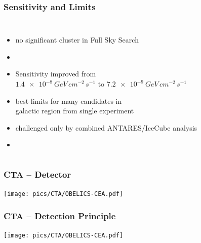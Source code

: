 \documentclass[8pt]{beamer}
\newcommand\unit[2]{\SI{#1}{#2}}
\begin{document}
    
    \begin{frame}
        \frametitle{Sensitivity and Limits}
        \begin{columns}
                \begin{itemize}
                    \item no significant cluster in Full Sky Search
                    \item[]
                    \item Sensitivity improved from\\
                        $\unit{1.4e-8}{GeV\,cm^{-2}\,s^{-1}}$ to $\unit{7.2e-9}{GeV\,cm^{-2}\,s^{-1}}$
                    \item best limits for many candidates in\\galactic region from single experiment
                    \item challenged only by combined ANTARES/IceCube analysis
                    \item[]
                \end{itemize}

                \resizebox{\textwidth}{!}{%
                }%
            \end{columns}
        
    \end{frame}

    
    \begin{frame}
        \frametitle{CTA -- Detector}
        \centering
        \texttt{[image: pics/CTA/OBELICS-CEA.pdf]}
        
    \end{frame}
    
        
    \begin{frame}
        \frametitle{CTA -- Detection Principle}
        \centering
        \texttt{[image: pics/CTA/OBELICS-CEA.pdf]}
        
    \end{frame}
    
\end{document}
